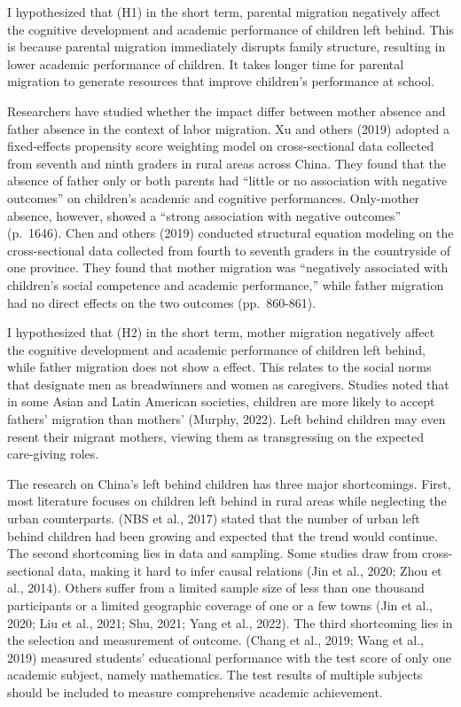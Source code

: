 \documentclass[
  man,floatsintext]{apa7}
\begin{document}
I hypothesized that (H1) in the short term, parental migration negatively affect the cognitive development and academic performance of children left behind. This is because parental migration immediately disrupts family structure, resulting in lower academic performance of children. It takes longer time for parental migration to generate resources that improve children's performance at school.

Researchers have studied whether the impact differ between mother absence and father absence in the context of labor migration. Xu and others (2019) adopted a fixed-effects propensity score weighting model on cross-sectional data collected from seventh and ninth graders in rural areas across China. They found that the absence of father only or both parents had ``little or no association with negative outcomes'' on children's academic and cognitive performances. Only-mother absence, however, showed a ``strong association with negative outcomes'' (p.~1646). Chen and others (2019) conducted structural equation modeling on the cross-sectional data collected from fourth to seventh graders in the countryside of one province. They found that mother migration was ``negatively associated with children's social competence and academic performance,'' while father migration had no direct effects on the two outcomes (pp.~860-861).

I hypothesized that (H2) in the short term, mother migration negatively affect the cognitive development and academic performance of children left behind, while father migration does not show a effect. This relates to the social norms that designate men as breadwinners and women as caregivers. Studies noted that in some Asian and Latin American societies, children are more likely to accept fathers' migration than mothers' (Murphy, 2022). Left behind children may even resent their migrant mothers, viewing them as transgressing on the expected care-giving roles.

The research on China's left behind children has three major shortcomings. First, most literature focuses on children left behind in rural areas while neglecting the urban counterparts. (NBS et al., 2017) stated that the number of urban left behind children had been growing and expected that the trend would continue. The second shortcoming lies in data and sampling. Some studies draw from cross-sectional data, making it hard to infer causal relations (Jin et al., 2020; Zhou et al., 2014). Others suffer from a limited sample size of less than one thousand participants or a limited geographic coverage of one or a few towns (Jin et al., 2020; Liu et al., 2021; Shu, 2021; Yang et al., 2022). The third shortcoming lies in the selection and measurement of outcome. (Chang et al., 2019; Wang et al., 2019) measured students' educational performance with the test score of only one academic subject, namely mathematics. The test results of multiple subjects should be included to measure comprehensive academic achievement.
\end{document}
